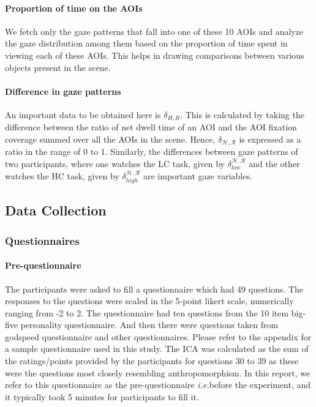 \documentclass[a4,twocolumn,10pt]{article}
\newcommand{\ie}{{\textit{i.e.\xspace}}}
\begin{document}
\paragraph{Proportion of time on the AOIs}

We fetch only the gaze patterns that fall into one of these 10 AOIs and analyze
the gaze distribution among them based on the proportion of time spent in
viewing each of these AOIs. This helps in drawing comparisons between various
objects present in the scene. 

\paragraph{Difference in gaze patterns}

An important data to be obtained here is $\delta_{H,R}$. This is calculated by
taking the difference between the ratio of net dwell time of an AOI and the AOI
fixation coverage summed over all the AOIs in the scene. Hence,
$\delta_{\mathcal{H},\mathcal{R}}$ is expressed as a ratio in the range of 0 to
1. Similarly, the differences between gaze patterns of two participants, where
one watches the LC task, given by $\delta_{low}^{\mathcal{H},\mathcal{R}}$ and
the other watches the HC task, given by
$\delta_{high}^{\mathcal{H},\mathcal{R}}$ are important gaze variables.

\subsection{Data Collection}

\subsubsection{Questionnaires}

\paragraph{Pre-questionnaire}

The participants were asked to fill a questionnaire which had 49 questions. The
responses to the questions were scaled in the 5-point likert scale, numerically
ranging from -2 to 2. The questionnaire had ten questions from the 10 item
big-five personality questionnaire. And then there were questions taken from
godspeed questionnaire and other questionnaires. Please refer to the appendix
for a sample questionnaire used in this study. The ICA was calculated as the sum
of the ratings/points provided by the participants for questions 30 to 39 as
these were the questions most closely resembling anthropomorphism. In this
report, we refer to this questionnaire as the pre-questionnaire \ie before the
experiment, and it typically took 5 minutes for participants to fill it. 
\end{document}
